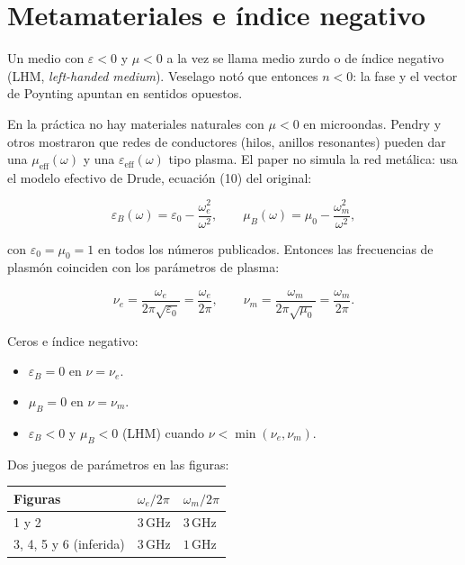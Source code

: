 \documentclass[11pt,a4paper]{article}
\begin{document}
\section{Metamateriales e índice negativo}
\label{sec:lhm}

Un medio con \(\varepsilon<0\) y \(\mu<0\) a la vez se llama medio zurdo o de
índice negativo (LHM, \textit{left-handed medium}).
Veselago notó que entonces \(n<0\): la fase y el vector de Poynting apuntan en
sentidos opuestos.

En la práctica no hay materiales naturales con \(\mu<0\) en microondas.
Pendry y otros mostraron que redes de conductores (hilos, anillos resonantes)
pueden dar una \(\mu_{\mathrm{eff}}(\omega)\) y una \(\varepsilon_{\mathrm{eff}}(\omega)\)
tipo plasma. El paper no simula la red metálica: usa el modelo efectivo de
Drude, ecuación (10) del original:

\begin{equation}
\varepsilon_B(\omega)=\varepsilon_0-\frac{\omega_e^2}{\omega^2},\qquad
\mu_B(\omega)=\mu_0-\frac{\omega_m^2}{\omega^2},
\end{equation}

con \(\varepsilon_0=\mu_0=1\) en todos los números publicados.
Entonces las frecuencias de plasmón coinciden con los parámetros de plasma:

\begin{equation}
\nu_e=\frac{\omega_e}{2\pi\sqrt{\varepsilon_0}}=\frac{\omega_e}{2\pi},\qquad
\nu_m=\frac{\omega_m}{2\pi\sqrt{\mu_0}}=\frac{\omega_m}{2\pi}.
\end{equation}

Ceros e índice negativo:

\begin{itemize}
\item \(\varepsilon_B=0\) en \(\nu=\nu_e\).
\item \(\mu_B=0\) en \(\nu=\nu_m\).
\item \(\varepsilon_B<0\) y \(\mu_B<0\) (LHM) cuando
\(\nu<\min(\nu_e,\nu_m)\).
\end{itemize}

Dos juegos de parámetros en las figuras:

\begin{center}
\begin{tabular}{lll}
\toprule
Figuras & \(\omega_e/2\pi\) & \(\omega_m/2\pi\) \\
\midrule
1 y 2 & \(3\,\mathrm{GHz}\) & \(3\,\mathrm{GHz}\) \\
3, 4, 5 y 6 (inferida) & \(3\,\mathrm{GHz}\) & \(1\,\mathrm{GHz}\) \\
\bottomrule
\end{tabular}
\end{center}
\end{document}
